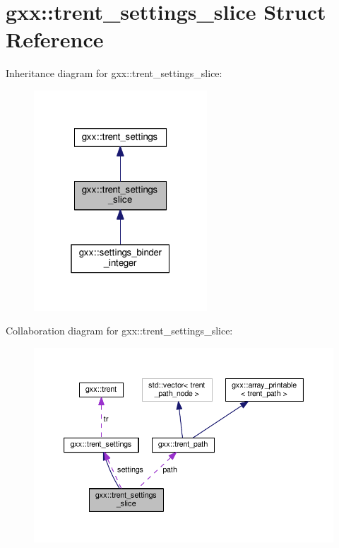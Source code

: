\hypertarget{structgxx_1_1trent__settings__slice}{}\section{gxx\+:\+:trent\+\_\+settings\+\_\+slice Struct Reference}
\label{structgxx_1_1trent__settings__slice}


Inheritance diagram for gxx\+:\+:trent\+\_\+settings\+\_\+slice\+:
\nopagebreak
\begin{figure}[H]
\begin{center}
\leavevmode
\includegraphics[width=184pt]{structgxx_1_1trent__settings__slice__inherit__graph}
\end{center}
\end{figure}


Collaboration diagram for gxx\+:\+:trent\+\_\+settings\+\_\+slice\+:
\nopagebreak
\begin{figure}[H]
\begin{center}
\leavevmode
\includegraphics[width=350pt]{structgxx_1_1trent__settings__slice__coll__graph}
\end{center}
\end{figure}
